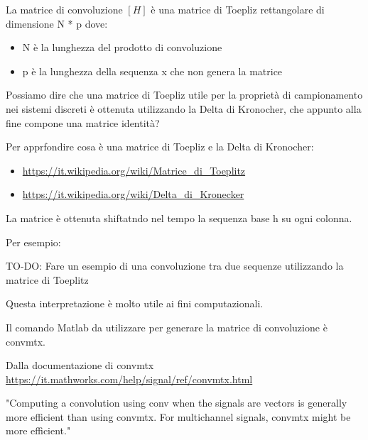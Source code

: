 \label{Domanda 2}

La matrice di convoluzione $\left[ H\right]$ è una matrice di Toepliz rettangolare di dimensione N * p dove: 

\begin{itemize}
    \item N è la lunghezza del prodotto di convoluzione 
    \item p è la lunghezza della sequenza x che non genera la matrice 
\end{itemize}

\begin{tcolorbox}[colback=red!5!white,colframe=red!75!black]
Possiamo dire che una matrice di Toepliz utile per la proprietà di campionamento nei sistemi discreti è ottenuta utilizzando la Delta di Kronocher, che appunto alla fine compone una matrice identità? 
\end{tcolorbox}

\label{Domanda 3} 

\begin{tcolorbox}
Per apprfondire cosa è una matrice di Toepliz e la Delta di Kronocher: 

\begin{itemize}
    \item \url{https://it.wikipedia.org/wiki/Matrice_di_Toeplitz} 
    \item \url{https://it.wikipedia.org/wiki/Delta_di_Kronecker}
\end{itemize}

\end{tcolorbox}

La matrice è ottenuta shiftatndo nel tempo la sequenza base h su ogni colonna. \newline 

Per esempio: 

\begin{tcolorbox}[colback=green!5!white,colframe=green!75!black]
TO-DO: Fare un esempio di una convoluzione tra due sequenze utilizzando la matrice di Toeplitz  
\end{tcolorbox} 

Questa interpretazione è molto utile ai fini computazionali. \newline 

Il comando Matlab da utilizzare per generare la matrice di convoluzione è convmtx. \newline 


\begin{tcolorbox}
    Dalla documentazione di convmtx \url{https://it.mathworks.com/help/signal/ref/convmtx.html} \newline 

    "Computing a convolution using conv when the signals are vectors is generally more efficient than using convmtx. For multichannel signals, convmtx might be more efficient."
\end{tcolorbox} 

